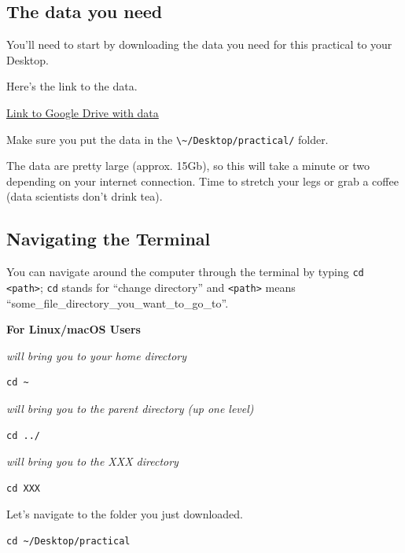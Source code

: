 \documentclass[
]{book}
\newcommand{\passthrough}[1]{#1}
\begin{document}
\hypertarget{the-data-you-need}{%
\subsection{The data you need}\label{the-data-you-need}}

You'll need to start by downloading the data you need for this practical to your Desktop.

Here's the link to the data.

\href{https://drive.google.com/drive/folders/1iDLB1y534DfgEZNPCYBrIj5X7g_XlBba?usp=share_link}{Link to Google Drive with data}

Make sure you put the data in the \passthrough{\lstinline!\~/Desktop/practical/!} folder.

The data are pretty large (approx. 15Gb), so this will take a minute or two depending on your internet connection. Time to stretch your legs or grab a coffee (data scientists don't drink tea).

\hypertarget{navigating-the-terminal}{%
\subsection{Navigating the Terminal}\label{navigating-the-terminal}}

You can navigate around the computer through the terminal by typing \passthrough{\lstinline!cd <path>!}; \passthrough{\lstinline!cd!} stands for ``change directory'' and \passthrough{\lstinline!<path>!} means ``some\_file\_directory\_you\_want\_to\_go\_to''.

\textbf{For Linux/macOS Users}

\emph{will bring you to your home directory}

\begin{lstlisting}
cd ~ 
\end{lstlisting}

\emph{will bring you to the parent directory (up one level) }

\begin{lstlisting}
cd ../ 
\end{lstlisting}

\emph{will bring you to the XXX directory}

\begin{lstlisting}
cd XXX 
\end{lstlisting}

Let's navigate to the folder you just downloaded.

\begin{lstlisting}
cd ~/Desktop/practical
\end{lstlisting}
\end{document}

